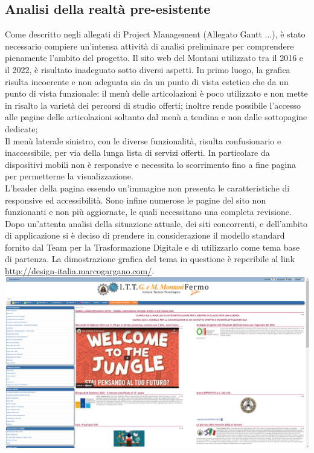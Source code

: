 \documentclass{article}
\begin{document}
    \subsection{\textbf{Analisi della realtà pre-esistente}}
    Come descritto negli allegati di Project Management (Allegato Gantt ...), è stato necessario compiere un'intensa attività di analisi preliminare per comprendere pienamente l'ambito del progetto.
	Il sito web del Montani utilizzato tra il 2016 e il 2022, è risultato inadeguato sotto diversi aspetti. In primo luogo, la grafica risulta incoerente  e non adeguata sia da un punto di vista estetico che da un punto di vista funzionale: il menù delle articolazioni è poco utilizzato e non mette in risalto la varietà dei percorsi di studio offerti; inoltre rende possibile l'accesso alle pagine delle articolazioni soltanto dal menù a tendina e non dalle sottopagine dedicate;\\
	Il menù laterale sinistro, con le diverse funzionalità, risulta confusionario e inaccessibile, per via della lunga lista di servizi offerti. In particolare da dispositivi mobili non è responsive e necessita lo scorrimento fino a fine pagina per permetterne la visualizzazione.\\
	L'header della pagina essendo un'immagine non presenta le caratteristiche di responsive ed accessibilità.
	Sono infine numerose le pagine del sito non funzionanti e non più aggiornate, le quali necessitano una completa revisione.
	Dopo un'attenta analisi della situazione attuale, dei siti concorrenti, e dell'ambito di applicazione si è deciso di prendere in considerazione il modello standard fornito dal Team per la Trasformazione Digitale e di utilizzarlo come tema base di partenza.
	La dimostrazione grafica del tema in questione è reperibile al link \url{http://design-italia.marcogargano.com/}.
	\includegraphics[scale=0.18]{ittmontaniex.png}	
\end{document}
